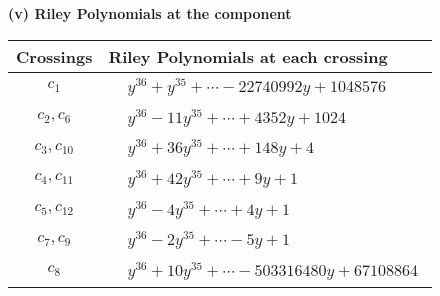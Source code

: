 \documentclass[1p]{elsarticle_modified}
\theoremstyle{definition}
\begin{document}
\flushleft \textbf{(v) Riley Polynomials at the component}\newline \\
\begin{tabular}{m{50pt}|m{274pt}}
Crossings & \hspace{64pt}Riley Polynomials at each crossing \\
\hline $$\begin{aligned}c_{1}\end{aligned}$$&$\begin{aligned}
&y^{36}+y^{35}+\cdots-22740992 y+1048576
\end{aligned}$\\
\hline $$\begin{aligned}c_{2},c_{6}\end{aligned}$$&$\begin{aligned}
&y^{36}-11 y^{35}+\cdots+4352 y+1024
\end{aligned}$\\
\hline $$\begin{aligned}c_{3},c_{10}\end{aligned}$$&$\begin{aligned}
&y^{36}+36 y^{35}+\cdots+148 y+4
\end{aligned}$\\
\hline $$\begin{aligned}c_{4},c_{11}\end{aligned}$$&$\begin{aligned}
&y^{36}+42 y^{35}+\cdots+9 y+1
\end{aligned}$\\
\hline $$\begin{aligned}c_{5},c_{12}\end{aligned}$$&$\begin{aligned}
&y^{36}-4 y^{35}+\cdots+4 y+1
\end{aligned}$\\
\hline $$\begin{aligned}c_{7},c_{9}\end{aligned}$$&$\begin{aligned}
&y^{36}-2 y^{35}+\cdots-5 y+1
\end{aligned}$\\
\hline $$\begin{aligned}c_{8}\end{aligned}$$&$\begin{aligned}
&y^{36}+10 y^{35}+\cdots-503316480 y+67108864
\end{aligned}$\\
\hline
\end{tabular}\\~\\
\end{document}

